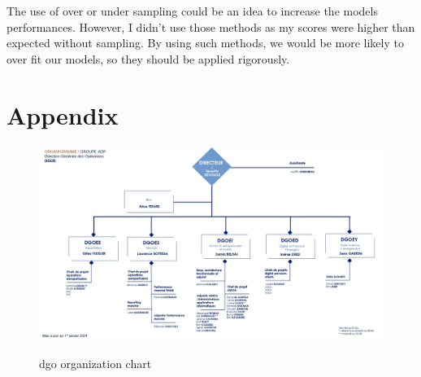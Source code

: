 \documentclass[12pt]{article}
\begin{document}
The use of over or under sampling could be an idea to increase the models performances. However, I didn't use those methods as my scores were higher than expected without sampling. By using such methods, we would be more likely to over fit our models, so they should be applied rigorously.

\newpage
\section*{Appendix}




\FloatBarrier
\begin{figure}[h]
    \includegraphics[width=1\textwidth]{organigramme_DGO.jpg}\\
    \caption{\acrshort{dgo} organization chart}
    \label{fig:DGO organization chart}
\end{figure}
\FloatBarrier
\end{document}
